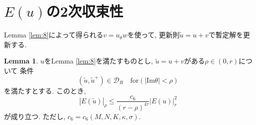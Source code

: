 \documentclass[a4paper]{ujarticle}
\numberwithin{equation}{section}
\theoremstyle{definition}
\newtheorem{lemma}{Lemma}
\begin{document}
        \section{$E(u)$の2次収束性}
        Lemma \ref{lem:8}によって得られる$v = u_{\theta} w$を使って,
        更新則$\tilde{u} = u + v$で暫定解を更新する.
        \begin{lemma} \label{lem:10}
            $u$をLemma \ref{lem:8}を満たすものとし, $\tilde{u} = u + v$がある$\rho \in (0, r)$について
            条件
            \begin{equation} 
                (\tilde{u}, \tilde{u}^{+}) \in \mathcal{D}_{R} \quad \text{for} (|\mathrm{Im} \theta| < \rho)
            \end{equation}
            を満たすとする. このとき,
            \begin{equation} \label{eq:29}
                |E(\tilde{u})|_{\rho} \leq \frac{c_6}{(r - \rho)^{4 \tau}} |E(u)|^2_{r}
            \end{equation}
            が成り立つ. ただし, $c_6 = c_6(M, N, K, \kappa, \sigma)$.
        \end{lemma}
\end{document}
